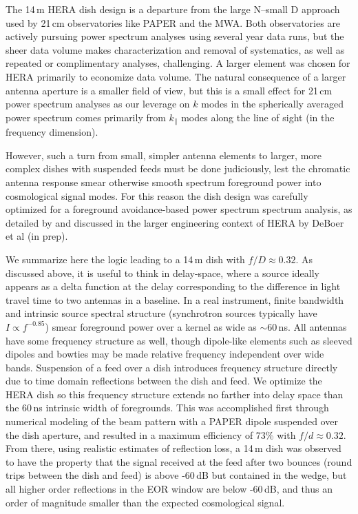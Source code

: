 \documentclass{emulateapj}
\begin{document}
The 14\,m HERA dish design is a departure from the large N--small D approach used by 21\,cm 
observatories like PAPER and the MWA. Both observatories are actively pursuing power 
spectrum analyses using several year data runs, but the sheer data volume makes 
characterization and removal of systematics, as well as repeated or complimentary analyses, 
challenging. A larger element was chosen for HERA primarily to economize data volume. 
The natural consequence of a larger antenna aperture is a smaller field of view, but this is a 
small effect for 21\,cm power spectrum analyses as our leverage on $k$ modes in the 
spherically averaged power spectrum comes primarily from $k_\parallel$ modes along the line 
of sight (in the frequency dimension).

However, such a turn from small, simpler antenna elements to larger, more complex dishes with 
suspended feeds must be done judiciously, lest the chromatic antenna response smear otherwise 
smooth spectrum foreground power into cosmological signal modes. For this reason the dish 
design was carefully optimized for a foreground avoidance-based power spectrum spectrum 
analysis, as detailed by \citet{heraMemo5} and discussed in the larger engineering context of 
HERA by DeBoer et al (in prep). 

We summarize here the logic leading to a 14\,m dish with $f/D\approx0.32$. As discussed 
above, it is useful to think in delay-space, where a source ideally appears as a delta function 
at the delay corresponding to the difference in light travel time to two antennas in a 
baseline. In a real instrument, finite bandwidth and intrinsic source spectral structure 
(synchrotron sources typically have $I\propto f^{-0.85}$) smear foreground power over a 
kernel as wide as $\sim60$\,ns. All antennas have some frequency structure as well, though 
dipole-like elements such as sleeved dipoles and bowties may be made relative frequency 
independent over wide bands. Suspension of a feed over a dish introduces frequency 
structure directly due to time domain reflections between the dish and feed. We optimize the 
HERA dish so this frequency structure extends no farther into delay space than the 60\,ns 
intrinsic width of foregrounds. This was accomplished first through numerical modeling of 
the beam pattern with a PAPER dipole suspended over the dish aperture, and resulted in a 
maximum efficiency of 73\% with $f/d\approx0.32$. From there, using realistic estimates of 
reflection loss, a 14\,m dish was observed to have the property that the signal received at the 
feed after two bounces (round trips between the dish and feed) is above -60\,dB but 
contained in the wedge, but all higher order reflections in the EOR window are below 
-60\,dB, and thus an order of magnitude smaller than the expected cosmological signal. 
\end{document}
